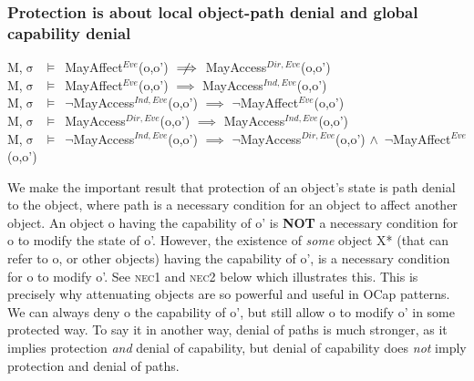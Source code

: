 \documentclass[a4paper,11pt, twoside,twocolumn]{article}
\newenvironment{logic}[1][]
{\begin{flushleft} \small }
{\end{flushleft}}
\newcommand{\loand}{$\land$}
\newcommand{\loimplies}{$\implies$}
\newcommand{\lonimplies}{$\centernot\implies$}
\newcommand{\losigma}{$\upsigma$}
\newcommand{\loturns} {$\vDash$}
\newcommand{\loneg}{$\boldsymbol \neg$}
\begin{document}
\subsubsection{Protection is about local object-path denial and global capability denial}
\begin{logic}
M,\losigma\ \loturns\ MayAffect$^{Eve}$(o,o') \lonimplies 
MayAccess$^{Dir,Eve}$(o,o')\linebreak
\\
M,\losigma\ \loturns\ MayAffect$^{Eve}$(o,o') \loimplies 
MayAccess$^{Ind,Eve}$(o,o')\linebreak
\\
M,\losigma\ \loturns\ \loneg MayAccess$^{Ind,Eve}$(o,o') \loimplies 
\loneg MayAffect$^{Eve}$(o,o')\linebreak
\\
M,\losigma\ \loturns\ MayAccess$^{Dir,Eve}$(o,o') \loimplies 
MayAccess$^{Ind,Eve}$(o,o')\linebreak
\\
M,\losigma\ \loturns\ \loneg MayAccess$^{Ind,Eve}$(o,o') \loimplies 
\loneg MayAccess$^{Dir,Eve}$(o,o') \loand\ \loneg MayAffect$^{Eve}$(o,o')\linebreak
\end{logic}
We make the important result that protection of an object's state is path denial to the object, where path is a necessary condition for an object to affect another object. An object o having the capability of o' is \textbf{NOT} a necessary condition for o to modify the state of o'. However, the existence of \textit{some} object X* (that can refer to o, or other objects) having the capability of o', is a necessary condition for o to modify o'. See \textsc{nec1} and \textsc{nec2} below which illustrates this. This is precisely why attenuating objects are so powerful and useful in OCap patterns. We can always deny o the capability of o', but still allow o to modify o' in some protected way. To say it in another way, denial of paths is much stronger, as it implies protection \textit{and} denial of capability, but denial of capability does \textit{not} imply protection and denial of paths.\\
\end{document}
